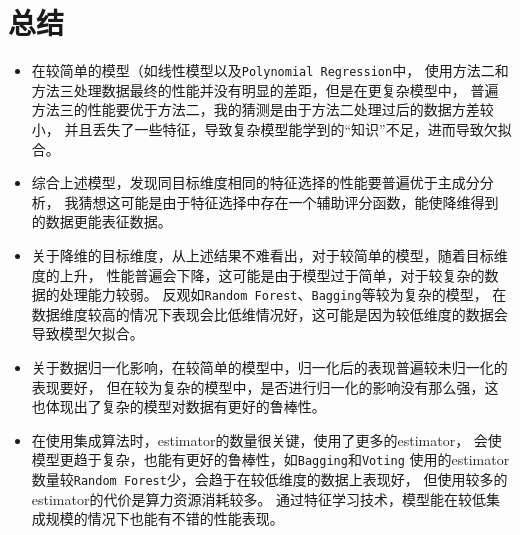 \documentclass[12pt, a4paper, oneside]{ctexart}
\begin{document}
\section{总结}
\begin{itemize}
    \item 在较简单的模型（如线性模型以及\texttt{Polynomial Regression}中，
    使用方法二和方法三处理数据最终的性能并没有明显的差距，但是在更复杂模型中，
    普遍方法三的性能要优于方法二，我的猜测是由于方法二处理过后的数据方差较小，
    并且丢失了一些特征，导致复杂模型能学到的“知识”不足，进而导致欠拟合。
    \item 综合上述模型，发现同目标维度相同的特征选择的性能要普遍优于主成分分析，
    我猜想这可能是由于特征选择中存在一个辅助评分函数，能使降维得到的数据更能表征数据。
    \item 关于降维的目标维度，从上述结果不难看出，对于较简单的模型，随着目标维度的上升，
    性能普遍会下降，这可能是由于模型过于简单，对于较复杂的数据的处理能力较弱。
    反观如\texttt{Random Forest}、\texttt{Bagging}等较为复杂的模型，
    在数据维度较高的情况下表现会比低维情况好，这可能是因为较低维度的数据会导致模型欠拟合。
    \item 关于数据归一化影响，在较简单的模型中，归一化后的表现普遍较未归一化的表现要好，
    但在较为复杂的模型中，是否进行归一化的影响没有那么强，这也体现出了复杂的模型对数据有更好的鲁棒性。
    \item 在使用集成算法时，estimator的数量很关键，使用了更多的estimator，
    会使模型更趋于复杂，也能有更好的鲁棒性，如\texttt{Bagging}和\texttt{Voting}
    使用的estimator数量较\texttt{Random Forest}少，会趋于在较低维度的数据上表现好，
    但使用较多的estimator的代价是算力资源消耗较多。
    通过特征学习技术，模型能在较低集成规模的情况下也能有不错的性能表现。
\end{itemize}
\end{document}
